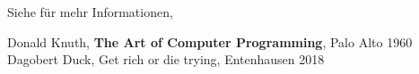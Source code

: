 \documentclass[ngerman,12pt]{scrreprt}
\begin{document}
Siehe \cite{Duck} für mehr Informationen, \cite{Duck}


\begin{thebibliography}{99}
 Donald Knuth, \textbf{The Art of Computer Programming}, Palo Alto 1960
 Dagobert Duck, Get rich or die trying, Entenhausen 2018
\end{thebibliography}
\end{document}
